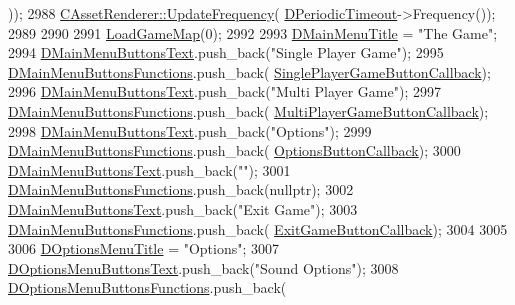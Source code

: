 \begin{DoxyCode}
      ));
2988     \hyperlink{classCAssetRenderer_a06e45891dcbc0a88570c537a4d6906c8}{CAssetRenderer::UpdateFrequency}(
      \hyperlink{classCApplicationData_a0265cb7aba9f099faed2a1c8ee588d33}{DPeriodicTimeout}->Frequency());
2989 
2990     
2991     \hyperlink{classCApplicationData_a89af0c7917be766575720e5ac79c8d2d}{LoadGameMap}(0);
2992     
2993     \hyperlink{classCApplicationData_a2b0ca036562d2af6eca3ee4a6e2330f8}{DMainMenuTitle} = \textcolor{stringliteral}{"The Game"};
2994     \hyperlink{classCApplicationData_a1e1c9f4434847c50210c0b36ff475f78}{DMainMenuButtonsText}.push\_back(\textcolor{stringliteral}{"Single Player Game"});
2995     \hyperlink{classCApplicationData_a9f9c3de6840e902711636257640a8e91}{DMainMenuButtonsFunctions}.push\_back(
      \hyperlink{classCApplicationData_a239a28599cbb6762c21306a4a03c6202}{SinglePlayerGameButtonCallback});
2996     \hyperlink{classCApplicationData_a1e1c9f4434847c50210c0b36ff475f78}{DMainMenuButtonsText}.push\_back(\textcolor{stringliteral}{"Multi Player Game"});
2997     \hyperlink{classCApplicationData_a9f9c3de6840e902711636257640a8e91}{DMainMenuButtonsFunctions}.push\_back(
      \hyperlink{classCApplicationData_afabb120415cdadf67edca20c67e8c6fa}{MultiPlayerGameButtonCallback});
2998     \hyperlink{classCApplicationData_a1e1c9f4434847c50210c0b36ff475f78}{DMainMenuButtonsText}.push\_back(\textcolor{stringliteral}{"Options"});
2999     \hyperlink{classCApplicationData_a9f9c3de6840e902711636257640a8e91}{DMainMenuButtonsFunctions}.push\_back(
      \hyperlink{classCApplicationData_a3647cf78eb59689b901d4204c81555b4}{OptionsButtonCallback});
3000     \hyperlink{classCApplicationData_a1e1c9f4434847c50210c0b36ff475f78}{DMainMenuButtonsText}.push\_back(\textcolor{stringliteral}{""});
3001     \hyperlink{classCApplicationData_a9f9c3de6840e902711636257640a8e91}{DMainMenuButtonsFunctions}.push\_back(\textcolor{keyword}{nullptr});
3002     \hyperlink{classCApplicationData_a1e1c9f4434847c50210c0b36ff475f78}{DMainMenuButtonsText}.push\_back(\textcolor{stringliteral}{"Exit Game"});
3003     \hyperlink{classCApplicationData_a9f9c3de6840e902711636257640a8e91}{DMainMenuButtonsFunctions}.push\_back(
      \hyperlink{classCApplicationData_a6a2c934fee258ccdb2a4a70c075f79fd}{ExitGameButtonCallback});
3004     
3005         
3006     \hyperlink{classCApplicationData_a1e73e21e92eb68c1cfc0c4bcae8196df}{DOptionsMenuTitle} = \textcolor{stringliteral}{"Options"};
3007     \hyperlink{classCApplicationData_aa9201da5408887973cb56fb1671ad6f8}{DOptionsMenuButtonsText}.push\_back(\textcolor{stringliteral}{"Sound Options"});
3008     \hyperlink{classCApplicationData_a4c9516d20be17a9c9d5c1119736037e5}{DOptionsMenuButtonsFunctions}.push\_back(

\end{DoxyCode}
